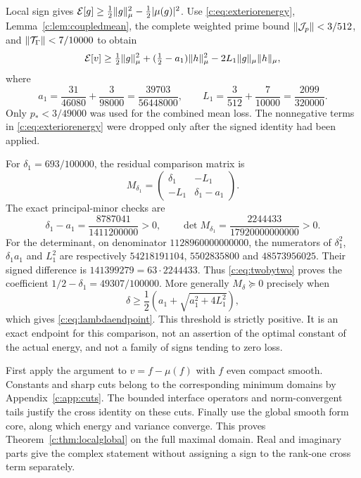 \documentclass[11pt,a4paper]{article}
\numberwithin{equation}{section}
\theoremstyle{definition}\newtheorem{definition}[theorem]{Definition}
\theoremstyle{remark}\newtheorem{remark}[theorem]{Remark}
\newcommand{\E}{\mathcal E}\newcommand{\D}{\mathcal D}
\begin{document}
Local sign gives $\E[g]\ge\tfrac12\norm g_\mu^2-\tfrac12|\mu(g)|^2$.
Use \eqref{c:eq:exteriorenergy}, Lemma~\ref{c:lem:coupledmean},
the complete weighted prime bound $\lVert\mathcal J_p\rVert<3/512$, and
$\lVert\mathcal T_\Gamma\rVert<7/10000$ to obtain
\begin{equation}\label{c:eq:twobytwo}
 \E[v]\ge\tfrac12\norm g_\mu^2+(\tfrac12-a_1)\norm h_\mu^2
 -2L_1\norm g_\mu\norm h_\mu,
\end{equation}
where
\begin{equation}\label{c:eq:improvedconstants}
 a_1=\frac{31}{46080}+\frac3{98000}=\frac{39703}{56448000},
 \qquad L_1=\frac3{512}+\frac7{10000}=\frac{2099}{320000}.
\end{equation}
Only $p_*<3/49000$ was used for the combined mean loss. The nonnegative terms in \eqref{c:eq:exteriorenergy} were dropped only after the signed identity had been applied.

For $\delta_1=693/100000$, the residual comparison matrix is
\[
 M_{\delta_1}=\begin{pmatrix}\delta_1&-L_1\\-L_1&\delta_1-a_1\end{pmatrix}.
\]
The exact principal-minor checks are
\begin{equation}\label{c:eq:margin}
 \delta_1-a_1=\frac{8787041}{1411200000}>0,\qquad
 \det M_{\delta_1}=\frac{2244433}{17920000000000}>0.
\end{equation}
For the determinant, on denominator $1128960000000000$, the numerators of
$\delta_1^2$, $\delta_1a_1$ and $L_1^2$ are respectively
$54218191104$, $5502835800$ and $48573956025$.
Their signed difference is $141399279=63\cdot2244433$.
Thus \eqref{c:eq:twobytwo} proves the coefficient
$1/2-\delta_1=49307/100000$.
More generally $M_\delta\succeq0$ precisely when
\[
 \delta\ge\frac12\left(a_1+\sqrt{a_1^2+4L_1^2}\right),
\]
which gives \eqref{c:eq:lambdaendpoint}. This threshold is strictly positive.
It is an exact endpoint for this comparison, not an assertion of the optimal constant of the actual energy, and not a family of signs tending to zero loss.

First apply the argument to $v=f-\mu(f)$ with $f$ even compact smooth.
Constants and sharp cuts belong to the corresponding minimum domains by Appendix~\ref{c:app:cuts}.
The bounded interface operators and norm-convergent tails justify the cross identity on these cuts.
Finally use the global smooth form core, along which energy and variance converge.
This proves Theorem~\ref{c:thm:localglobal} on the full maximal domain.
Real and imaginary parts give the complex statement without assigning a sign to the rank-one cross term separately.
\end{document}
